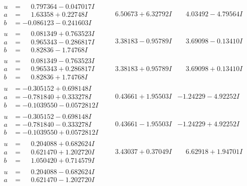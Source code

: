 \documentclass[1p]{elsarticle_modified}
\theoremstyle{definition}
\begin{document}
$$\begin{array}{c|c|c}
\begin{aligned}
u &= \phantom{-}0.797364 - 0.047017 I \\
a &= \phantom{-}1.63358 + 0.22748 I \\
b &= -0.086123 - 0.241603 I\end{aligned}
 & \phantom{-}6.50673 + 6.32792 I & \phantom{-}4.03492 - 4.79564 I \\ \hline\begin{aligned}
u &= \phantom{-}0.081349 + 0.763523 I \\
a &= \phantom{-}0.965343 - 0.286817 I \\
b &= \phantom{-}0.82836 - 1.74768 I\end{aligned}
 & \phantom{-}3.38183 - 0.95789 I & \phantom{-}3.69098 - 0.13410 I \\ \hline\begin{aligned}
u &= \phantom{-}0.081349 - 0.763523 I \\
a &= \phantom{-}0.965343 + 0.286817 I \\
b &= \phantom{-}0.82836 + 1.74768 I\end{aligned}
 & \phantom{-}3.38183 + 0.95789 I & \phantom{-}3.69098 + 0.13410 I \\ \hline\begin{aligned}
u &= -0.305152 + 0.698148 I \\
a &= -0.781840 + 0.333278 I \\
b &= -0.1039550 - 0.0572812 I\end{aligned}
 & \phantom{-}0.43661 + 1.95503 I & -1.24229 - 4.92252 I \\ \hline\begin{aligned}
u &= -0.305152 - 0.698148 I \\
a &= -0.781840 - 0.333278 I \\
b &= -0.1039550 + 0.0572812 I\end{aligned}
 & \phantom{-}0.43661 - 1.95503 I & -1.24229 + 4.92252 I \\ \hline\begin{aligned}
u &= \phantom{-}0.204088 + 0.682624 I \\
a &= \phantom{-}0.621470 + 1.202720 I \\
b &= \phantom{-}1.050420 + 0.714579 I\end{aligned}
 & \phantom{-}3.43037 + 0.37049 I & \phantom{-}6.62918 + 1.94701 I \\ \hline\begin{aligned}
u &= \phantom{-}0.204088 - 0.682624 I \\
a &= \phantom{-}0.621470 - 1.202720 I \\

\end{aligned}
\end{array}$$
\end{document}
